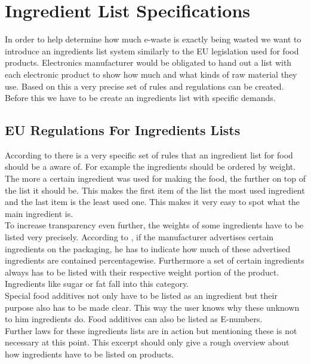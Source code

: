 \section{Ingredient List Specifications} 

In order to help determine how much e-waste is exactly being wasted we want to introduce an ingredients list system similarly to the EU legislation used for food products\cite{eu-ingredients-bmel}. Electronics manufacturer would be obligated to hand out a list with each electronic product to show how much and what kinds of raw material they use. Based on this a very precise set of rules and regulations can be created.\\
Before this we have to be create an ingredients list with specific demands. 

\subsection{EU Regulations For Ingredients Lists}

According to \cite{eu-ingredients-info-pdf} there is a very specific set of rules that an ingredient list for food should be a aware of. For example the ingredients should be ordered by weight. The more a certain ingredient was used for making the food, the further on top of the list it should be. This makes the first item of the list the most used ingredient and the last item is the least used one. This makes it very easy to spot what the main ingredient is.\\

To increase transparency even further, the weights of some ingredients have to be listed very precisely. According to \cite{eu-ingredients-info-pdf}, if the manufacturer advertises certain ingredients on the packaging, he has to indicate how much of these advertised ingredients are contained percentagewise. Furthermore a set of certain ingredients always has to be listed with their respective weight portion of the product. Ingredients like sugar or fat fall into this category. \\
Special food additives not only have to be listed as an ingredient but their purpose also has to be made clear. This way the user knows why these unknown to him ingredients do. Food additives can also be listed as E-numbers.  \\

Further laws for these ingredients lists are in action but mentioning these is not necessary at this point. This excerpt should only give a rough overview about how ingredients have to be listed on products. 


